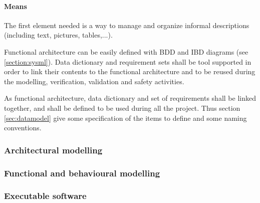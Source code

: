\paragraph{Means}

The first element needed is a way to manage and organize informal descriptions (including text, pictures, tables,...). 

Functional architecture can be easily defined with BDD and IBD diagrams (see \ref{section:sysml}).
Data dictionary  and requirement sets shall be tool supported in order to link their contents to the functional architecture and to  be reused during the modelling, verification, validation and safety activities.

As functional architecture, data dictionary and set of requirements shall be linked together, and shall be defined to be used during all the project. Thus section \ref{sec:datamodel} give some specification of the items to define and some naming conventions.

\subsubsection{Architectural modelling}

\subsubsection{Functional and behavioural modelling}

\subsubsection{Executable software}

